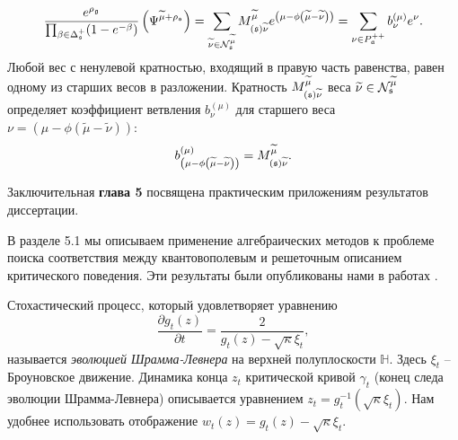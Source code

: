 \documentclass[14pt,autoref,href,facsimile
]{disser}
\begin{document}
\begin{Prop}
\begin{equation}
\frac{e^{\rho _{\gf}}}{\prod_{\beta \in \Delta _{\sfr%
}^{+}}(1-e^{-\beta })}\left( \Psi ^{\widetilde{\mu }+\rho _{\sfr%
}}\right) =\sum_{\widetilde{\nu }\in \mathcal{N}_{\sfr}^{\widetilde{\mu }%
}}M_{\left( \sfr\right) \widetilde{\nu }}^{\widetilde{\mu }}e^{\left(
\mu -\phi \left( \widetilde{\mu }-\widetilde{\nu }\right) \right)
}=\sum_{\nu \in P_{\af}^{++}}b_{\nu }^{(\mu )}e^{\nu }.
\label{singular main-4}
\end{equation}
Любой вес с ненулевой кратностью, входящий в правую часть равенства, равен одному из старших весов в разложении. Кратность $M_{\left( \mathfrak{s}
\right) \widetilde{\nu }}^{\widetilde{\mu }}$ веса  $\widetilde{\nu}\in \mathcal{N}_{\mathfrak{s}}^{\widetilde{\mu }}$ определяет коэффициент ветвления  $b_{\nu }^{(\mu )}$ для старшего веса $\nu =\left( \mu-\phi \left( \widetilde{\mu }-\widetilde{\nu }\right) \right) $:
\[
b_{\left( \mu -\phi \left( \widetilde{\mu }-\widetilde{\nu }\right) \right)
}^{(\mu )}=M_{\left( \mathfrak{s}\right) \widetilde{\nu }}^{\widetilde{\mu }}.
\]
\end{Prop}



Заключительная \textbf{глава 5} посвящена практическим приложениям результатов диссертации.

 В разделе 5.1 мы  описываем применение алгебраических методов к проблеме поиска соответствия между квантовополевым и решеточным описанием критического поведения. Эти результаты были опубликованы нами в работах .

Стохастический процесс, который удовлетворяет уравнению 
\begin{equation}
\label{eq:166}
  \frac{\partial g_t(z)}{\partial t} = \frac{ 2}{g_t(z)-\sqrt{\kappa}\xi_{t}} ,
\end{equation}
называется {\it эволюцией Шрамма-Левнера} на верхней полуплоскости $\mathbb{H}$. Здесь $\xi_{t}$ -- Броуновское движение. Динамика конца  $z_{t}$ критической кривой $\gamma_{t}$ (конец следа эволюции Шрамма-Левнера) описывается уравнением $z_{t}=g_{t}^{-1}(\sqrt{\kappa}\xi_{t})$. Нам удобнее использовать отображение $w_{t} (z)=g_{t}(z)-\sqrt{\kappa}\xi_{t}$. 
\end{document}

